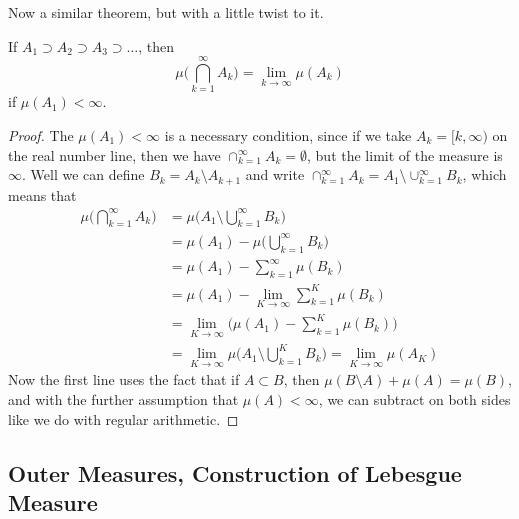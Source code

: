 \documentclass{article}
\begin{document}
Now a similar theorem, but with a little twist to it. 

\begin{proposition}
  If $A_1 \supset A_2 \supset A_3 \supset \ldots$, then 
  \[\mu\bigg( \bigcap_{k=1}^\infty A_k \bigg) = \lim_{k \rightarrow \infty} \mu(A_k)\]
  if $\mu(A_1) < \infty$. 
\end{proposition}
\begin{proof}
  The $\mu(A_1) < \infty$ is a necessary condition, since if we take $A_k = [k, \infty)$ on the real number line, then we have $\cap_{k=1}^\infty A_k = \emptyset$, but the limit of the measure is $\infty$. Well we can define $B_k = A_k \setminus A_{k+1}$ and write $\cap_{k=1}^\infty A_k = A_1 \setminus \cup_{k=1}^\infty B_k$, which means that 
  \begin{align*}
    \mu\bigg( \bigcap_{k=1}^\infty A_k \bigg) & = \mu\bigg( A_1 \setminus \bigcup_{k=1}^\infty B_k \bigg) \\
    & = \mu(A_1) - \mu\bigg( \bigcup_{k=1}^\infty B_k\bigg) \\
    & = \mu(A_1) - \sum_{k=1}^\infty \mu(B_k) \\
    & = \mu(A_1) - \lim_{K \rightarrow \infty} \sum_{k=1}^K \mu(B_k) \\
    & = \lim_{K \rightarrow \infty} \bigg( \mu(A_1) - \sum_{k=1}^K \mu(B_k) \bigg) \\
    & = \lim_{K \rightarrow \infty} \mu \bigg( A_1 \setminus \bigcup_{k=1}^K B_k \bigg) = \lim_{K \rightarrow \infty} \mu(A_K)
  \end{align*}
  Now the first line uses the fact that if $A \subset B$, then $\mu(B \setminus A) + \mu(A) = \mu(B)$, and with the further assumption that $\mu(A) < \infty$, we can subtract on both sides like we do with regular arithmetic. 
\end{proof}

\subsection{Outer Measures, Construction of Lebesgue Measure}
\end{document}
